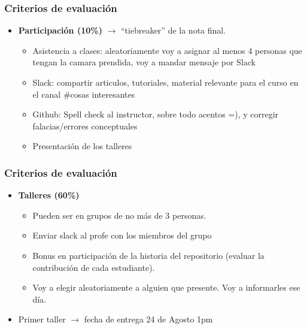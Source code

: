 \documentclass[
  shownotes,
  xcolor={svgnames},
  hyperref={colorlinks,citecolor=DarkBlue,linkcolor=DarkRed,urlcolor=DarkBlue}
  , aspectratio=169]{beamer}
\begin{document}
\begin{frame}
\frametitle{Criterios de evaluación}

\begin{itemize}
\item {\bf Participación (10\%)} $\rightarrow$ ``tiebreaker'' de la nota final. 
\medskip
  \begin{itemize}
    \item Asistencia a clases: aleatoriamente voy a asignar al menos 4 personas que tengan la camara prendida, voy a mandar mensaje por Slack
    \medskip
    \item Slack: compartir articulos, tutoriales, material relevante para el curso en el canal \#cosas interesantes
    \medskip
    \item Github: Spell check al instructor, sobre todo acentos =), y corregir falacias/errores conceptuales
    \medskip
    \item Presentación de los talleres

  \end{itemize}
\end{itemize}

\end{frame}
\begin{frame}
\frametitle{Criterios de evaluación}
\begin{itemize}
  \item {\bf Talleres (60\%)}
  \bigskip
\begin{itemize}
  \item Pueden ser en grupos de no más de 3 personas. 
  \medskip
  \item Enviar slack al profe con los miembros del grupo
  \medskip
  \item Bonus en participación de la historia del repositorio (evaluar la contribución de cada estudiante).
  \medskip
  \item Voy a elegir aleatoriamente a alguien que presente. Voy a informarles ese día.
  \end{itemize}
\bigskip

   \item Primer taller $\rightarrow$ fecha de entrega 24 de Agosto 1pm
   
\end{itemize}

\end{frame}
\end{document}
